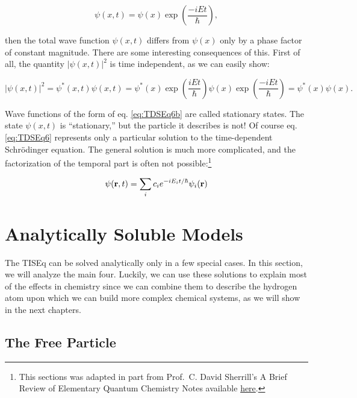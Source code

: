 \documentclass[
  9pt,
]{extbook}
\theoremstyle{definition}
\theoremstyle{definition}
\theoremstyle{definition}
\theoremstyle{remark}
\begin{document}
\begin{equation}
\psi(x, t) = \psi(x) \exp\left(\frac{-iEt}{\hbar}\right),
\label{eq:TDSEq6b}
\end{equation}

then the total wave function \(\psi(x, t)\) differs from \(\psi(x)\) only by a phase factor of constant magnitude. There are some interesting consequences of this. First of all, the quantity \(\vert \psi(x, t) \vert^2\) is time independent, as we can easily show:

\begin{equation}
\vert \psi(x, t) \vert^2 = \psi^{*}(x, t) \psi(x, t)=
\psi^{*}(x)\exp\left(\frac{iEt}{\hbar}\right)\psi(x)\exp\left(\frac{-iEt}{\hbar}\right)= \psi^{*}(x) \psi(x).
\label{eq:TDSEq7}
\end{equation}

Wave functions of the form of eq. \eqref{eq:TDSEq6b} are called stationary states. The state \(\psi(x, t)\) is ``stationary,'' but the particle it describes is not!
Of course eq. \eqref{eq:TDSEq6} represents only a particular solution to the time-dependent Schrödinger equation. The general solution is much more complicated, and the factorization of the temporal part is often not possible:\footnote{This sections was adapted in part from Prof.~C. David Sherrill's A Brief Review of Elementary Quantum Chemistry Notes available \href{http://vergil.chemistry.gatech.edu/notes/quantrev/node1.html}{here}.}

\begin{equation}
\psi({\bf r}, t) = \sum_i c_i e^{-iE_it / \hbar} \psi_i({\bf r})
\end{equation}

\hypertarget{Models}{%
\chapter{Analytically Soluble Models}\label{Models}}

The TISEq can be solved analytically only in a few special cases. In this section, we will analyze the main four. Luckily, we can use these solutions to explain most of the effects in chemistry since we can combine them to describe the hydrogen atom upon which we can build more complex chemical systems, as we will show in the next chapters.

\hypertarget{the-free-particle}{%
\section{The Free Particle}\label{the-free-particle}}
\end{document}
